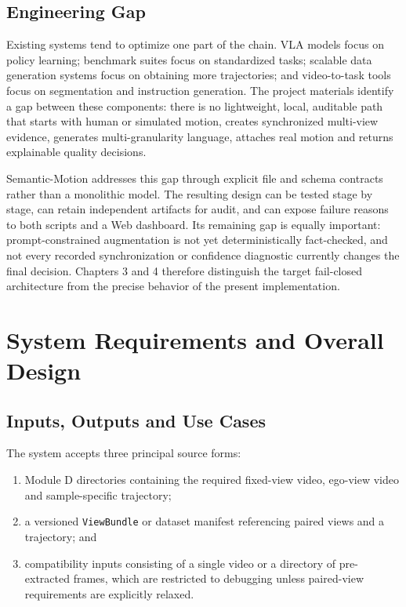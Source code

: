 \documentclass[11pt,oneside]{report}
\begin{document}
\section{Engineering Gap}
Existing systems tend to optimize one part of the chain. VLA models focus on
policy learning; benchmark suites focus on standardized tasks; scalable data
generation systems focus on obtaining more trajectories; and video-to-task
tools focus on segmentation and instruction generation. The project materials
identify a gap between these components: there is no lightweight, local,
auditable path that starts with human or simulated motion, creates synchronized
multi-view evidence, generates multi-granularity language, attaches real motion
and returns explainable quality decisions.

Semantic-Motion addresses this gap through explicit file and schema contracts
rather than a monolithic model. The resulting design can be tested stage by
stage, can retain independent artifacts for audit, and can expose failure
reasons to both scripts and a Web dashboard. Its remaining gap is equally
important: prompt-constrained augmentation is not yet deterministically
fact-checked, and not every recorded synchronization or confidence diagnostic
currently changes the final decision. Chapters 3 and 4 therefore distinguish
the target fail-closed architecture from the precise behavior of the present
implementation.

\chapter{System Requirements and Overall Design}
\section{Inputs, Outputs and Use Cases}
The system accepts three principal source forms:

\begin{enumerate}
    \item Module D directories containing the required fixed-view video,
    ego-view video and sample-specific trajectory;
    \item a versioned \texttt{ViewBundle} or dataset manifest referencing
    paired views and a trajectory; and
    \item compatibility inputs consisting of a single video or a directory of
    pre-extracted frames, which are restricted to debugging unless paired-view
    requirements are explicitly relaxed.
\end{enumerate}
\end{document}
